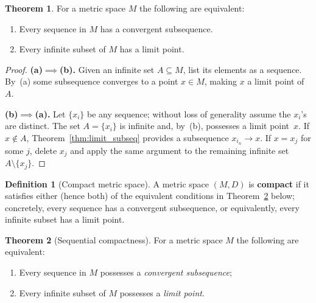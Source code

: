 \documentclass[12pt]{article}
\theoremstyle{definition} %
\newtheorem{theorem}{Theorem}
\newtheorem{definition}{Definition}
\theoremstyle{plain} %
\begin{document}
\begin{theorem}\label{thm:seq_limit_pt}
  For a metric space $M$ the following are equivalent:
  \begin{enumerate}[label=\textup{(\alph*)}]
      \item Every sequence in $M$ has a convergent subsequence.
      \item Every infinite subset of $M$ has a limit point.
  \end{enumerate}
\end{theorem}

\begin{proof}
  \textbf{(a)$\!\implies\!$(b).}\;
  Given an infinite set $A\subseteq M$, list its elements as a sequence.
  By~(a) some subsequence converges to a point $x\in M$, making $x$ a
  limit point of $A$.

  \medskip
  \textbf{(b)$\!\implies\!$(a).}\;
  Let $\{x_i\}$ be any sequence; without loss of generality assume the
  $x_i$’s are distinct.  
  The set $A=\{x_i\}$ is infinite and, by~(b), possesses a limit
  point $x$.  
  If $x\notin A$, Theorem \ref{thm:limit_subseq} provides a subsequence
  $x_{i_n}\to x$.  
  If $x=x_j$ for some $j$, delete $x_j$ and apply the same argument to
  the remaining infinite set $A\setminus\{x_j\}$.
\end{proof}

\begin{definition}[Compact metric space]\label{def:compact_metric}
  A metric space $(M,D)$ is \textbf{compact} if it satisfies
  either (hence both) of the equivalent conditions in
  Theorem \ref{thm:seq_compact} below; concretely,
  every sequence has a convergent subsequence, or equivalently,
  every infinite subset has a limit point.
\end{definition}

\begin{theorem}[Sequential compactness]\label{thm:seq_compact}
  For a metric space $M$ the following are equivalent:
  \begin{enumerate}[label=\textup{(\alph*)}]
      \item Every sequence in $M$ possesses a \emph{convergent subsequence};
      \item Every infinite subset of $M$ possesses a \emph{limit point}.
  \end{enumerate}
\end{theorem}
\end{document}
